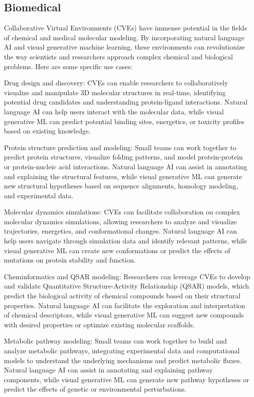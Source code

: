 \subsection{Biomedical}
Collaborative Virtual Environments (CVEs) have immense potential in the fields of chemical and medical molecular modeling. By incorporating natural language AI and visual generative machine learning, these environments can revolutionize the way scientists and researchers approach complex chemical and biological problems. Here are some specific use cases:

    Drug design and discovery:
    CVEs can enable researchers to collaboratively visualize and manipulate 3D molecular structures in real-time, identifying potential drug candidates and understanding protein-ligand interactions. Natural language AI can help users interact with the molecular data, while visual generative ML can predict potential binding sites, energetics, or toxicity profiles based on existing knowledge.

    Protein structure prediction and modeling:
    Small teams can work together to predict protein structures, visualize folding patterns, and model protein-protein or protein-nucleic acid interactions. Natural language AI can assist in annotating and explaining the structural features, while visual generative ML can generate new structural hypotheses based on sequence alignments, homology modeling, and experimental data.

    Molecular dynamics simulations:
    CVEs can facilitate collaboration on complex molecular dynamics simulations, allowing researchers to analyze and visualize trajectories, energetics, and conformational changes. Natural language AI can help users navigate through simulation data and identify relevant patterns, while visual generative ML can create new conformations or predict the effects of mutations on protein stability and function.

    Cheminformatics and QSAR modeling:
    Researchers can leverage CVEs to develop and validate Quantitative Structure-Activity Relationship (QSAR) models, which predict the biological activity of chemical compounds based on their structural properties. Natural language AI can facilitate the exploration and interpretation of chemical descriptors, while visual generative ML can suggest new compounds with desired properties or optimize existing molecular scaffolds.

    Metabolic pathway modeling:
    Small teams can work together to build and analyze metabolic pathways, integrating experimental data and computational models to understand the underlying mechanisms and predict metabolic fluxes. Natural language AI can assist in annotating and explaining pathway components, while visual generative ML can generate new pathway hypotheses or predict the effects of genetic or environmental perturbations.

